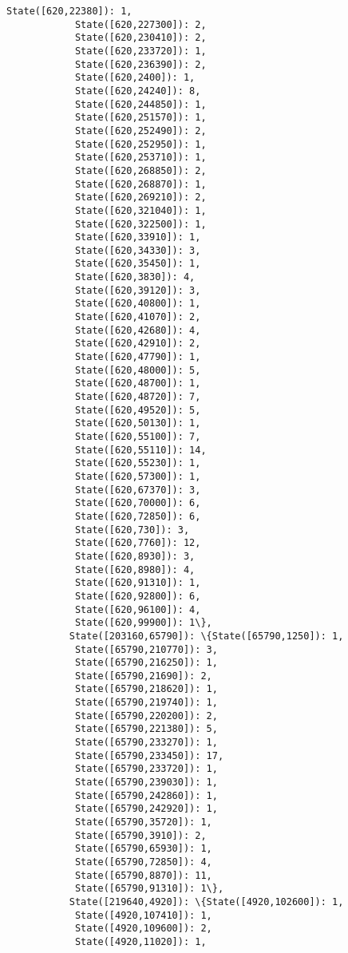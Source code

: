 \documentclass[11pt]{article}
\begin{document}
\begin{Verbatim}[commandchars=\\\{\}]
            State([620,22380]): 1,
            State([620,227300]): 2,
            State([620,230410]): 2,
            State([620,233720]): 1,
            State([620,236390]): 2,
            State([620,2400]): 1,
            State([620,24240]): 8,
            State([620,244850]): 1,
            State([620,251570]): 1,
            State([620,252490]): 2,
            State([620,252950]): 1,
            State([620,253710]): 1,
            State([620,268850]): 2,
            State([620,268870]): 1,
            State([620,269210]): 2,
            State([620,321040]): 1,
            State([620,322500]): 1,
            State([620,33910]): 1,
            State([620,34330]): 3,
            State([620,35450]): 1,
            State([620,3830]): 4,
            State([620,39120]): 3,
            State([620,40800]): 1,
            State([620,41070]): 2,
            State([620,42680]): 4,
            State([620,42910]): 2,
            State([620,47790]): 1,
            State([620,48000]): 5,
            State([620,48700]): 1,
            State([620,48720]): 7,
            State([620,49520]): 5,
            State([620,50130]): 1,
            State([620,55100]): 7,
            State([620,55110]): 14,
            State([620,55230]): 1,
            State([620,57300]): 1,
            State([620,67370]): 3,
            State([620,70000]): 6,
            State([620,72850]): 6,
            State([620,730]): 3,
            State([620,7760]): 12,
            State([620,8930]): 3,
            State([620,8980]): 4,
            State([620,91310]): 1,
            State([620,92800]): 6,
            State([620,96100]): 4,
            State([620,99900]): 1\},
           State([203160,65790]): \{State([65790,1250]): 1,
            State([65790,210770]): 3,
            State([65790,216250]): 1,
            State([65790,21690]): 2,
            State([65790,218620]): 1,
            State([65790,219740]): 1,
            State([65790,220200]): 2,
            State([65790,221380]): 5,
            State([65790,233270]): 1,
            State([65790,233450]): 17,
            State([65790,233720]): 1,
            State([65790,239030]): 1,
            State([65790,242860]): 1,
            State([65790,242920]): 1,
            State([65790,35720]): 1,
            State([65790,3910]): 2,
            State([65790,65930]): 1,
            State([65790,72850]): 4,
            State([65790,8870]): 11,
            State([65790,91310]): 1\},
           State([219640,4920]): \{State([4920,102600]): 1,
            State([4920,107410]): 1,
            State([4920,109600]): 2,
            State([4920,11020]): 1,

\end{Verbatim}
\end{document}
